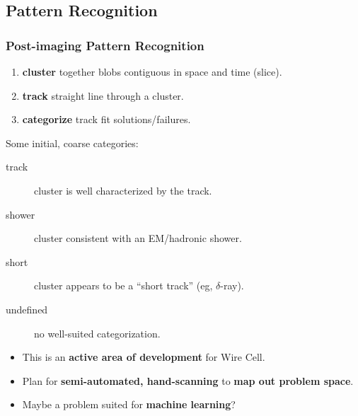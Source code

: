 \subsection{Pattern Recognition}

\begin{frame}
  \frametitle{Post-imaging Pattern Recognition}

  \begin{enumerate}
  \item \textbf{cluster} together blobs contiguous in space and time
    (slice).
  \item \textbf{track} straight line through a cluster.
  \item \textbf{categorize} track fit solutions/failures.
  \end{enumerate}
  Some initial, coarse categories:
  \begin{description}
  \item[track] cluster is well characterized by the track.
  \item[shower] cluster consistent with an EM/hadronic shower.
  \item[short] cluster appears to be a ``short track'' (eg, $\delta$-ray).
  \item[undefined] no well-suited categorization.
  \end{description}

  \begin{itemize}
  \item This is an \textbf{active area of development} for Wire Cell.
  \item Plan for \textbf{semi-automated, hand-scanning} to \textbf{map out problem space}.
  \item Maybe a problem suited for \textbf{machine learning}? 
  \end{itemize}

\end{frame}
